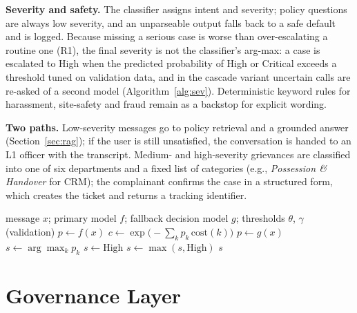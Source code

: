 \documentclass[conference]{IEEEtran}
\begin{document}
\textbf{Severity and safety.} The classifier assigns intent and severity; policy questions are always low severity,
and an unparseable output falls back to a safe default and is logged. Because missing a serious case is worse than
over-escalating a routine one (R1), the final severity is not the classifier's arg-max: a case is escalated to High
when the predicted probability of High or Critical exceeds a threshold tuned on validation data, and in the
cascade variant uncertain calls are re-asked of a second model (Algorithm~\ref{alg:sev}). Deterministic keyword
rules for harassment, site-safety and fraud remain as a backstop for explicit wording.

\textbf{Two paths.} Low-severity messages go to policy retrieval and a grounded answer (Section~\ref{sec:rag}); if
the user is still unsatisfied, the conversation is handed to an L1 officer with the transcript. Medium- and
high-severity grievances are classified into one of six departments and a fixed list of categories (e.g.,
\emph{Possession \& Handover} for CRM); the complainant confirms the case in a structured form, which creates the
ticket and returns a tracking identifier.

\begin{algorithm}[t]
\caption{Uncertainty-aware severity decision}
\label{alg:sev}
\footnotesize
\begin{algorithmic}[1]
\Require message $x$; primary model $f$; fallback decision model $g$; thresholds $\theta$, $\gamma$ (validation)
\State $p \gets f(x)$ 
\State $c \gets \exp\!\big(-\sum_k p_k\,\mathrm{cost}(k)\big)$ 
 $p \gets g(x)$ 
\EndIf
\State $s \gets \arg\max_k p_k$
 $s \gets \mathrm{High}$
\EndIf
{} $s \gets \max(s, \mathrm{High})$
\EndIf
\State \Return $s$ 
\end{algorithmic}
\end{algorithm}
\section{Governance Layer}
\label{sec:gov}
\end{document}
